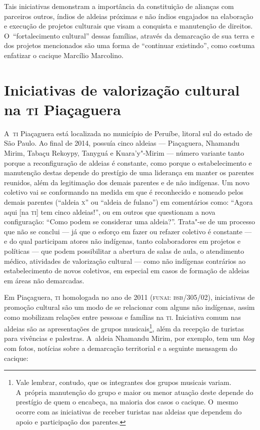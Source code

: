 Tais iniciativas demonstram a importância da constituição de alianças
com parceiros outros, índios de aldeias próximas e não índios engajados
na elaboração e execução de projetos culturais que visam a conquista e
manutenção de direitos. O~``fortalecimento cultural'' dessas famílias,
através da demarcação de sua terra e dos projetos mencionados são uma
forma de ``continuar existindo'', como costuma enfatizar o cacique Marcílio
Marcolino. 

\section{Iniciativas de valorização cultural na \textsc{ti} Piaçaguera}

A~\textsc{ti} Piaçaguera está localizada no município de Peruíbe, litoral sul do
estado de São Paulo. Ao final de 2014, possuía cinco aldeias ---
Piaçaguera, Nhamandu Mirim, Tabaçu Rekoypy, Tanyguá e Kuara’y"-Mirim ---
número variante tanto porque a reconfiguração de aldeias é constante,
como porque o estabelecimento e manutenção destas depende do prestígio
de uma liderança em manter os parentes reunidos, além da legitimação
dos demais parentes e de não indígenas. Um novo coletivo vai se
conformando na medida em que é reconhecido e nomeado pelos demais
parentes (``aldeia \textsc{x}'' ou ``aldeia de fulano'') em comentários como: ``Agora
aqui [na \textsc{ti}] tem cinco aldeias!'', ou em outros que questionam a nova
configuração: ``Como podem se considerar uma aldeia?''. Trata"-se de um
processo que não se conclui --- já que o esforço em fazer ou refazer
coletivo é constante --- e do qual participam atores não indígenas, tanto
colaboradores em projetos e políticas --- que podem possibilitar a
abertura de salas de aula, o atendimento médico, atividades de
valorização cultural --- como não indígenas contrários ao estabelecimento
de novos coletivos, em especial em casos de formação de aldeias em
áreas não demarcadas. 

Em Piaçaguera, \textsc{ti} homologada no ano de 2011 (\textsc{funai}: \textsc{bsb}/305/02),
iniciativas de promoção cultural são um modo de se relacionar com
alguns não indígenas, assim como mobilizam relações entre pessoas e
famílias na \textsc{ti}. Iniciativa comum nas aldeias são as apresentações de
grupos musicais\footnote{Vale lembrar, contudo, que os integrantes dos
grupos musicais variam. A~própria manutenção do grupo e maior ou menor
atuação deste depende do prestígio de quem o encabeça, na maioria dos
casos o cacique. O~mesmo ocorre com as iniciativas de receber turistas
nas aldeias que dependem do apoio e participação dos parentes.}, além
da recepção de turistas para vivências e palestras. A~aldeia Nhamandu
Mirim, por exemplo, tem um \emph{blog} com fotos, notícias sobre a demarcação
territorial e a seguinte mensagem do cacique:

